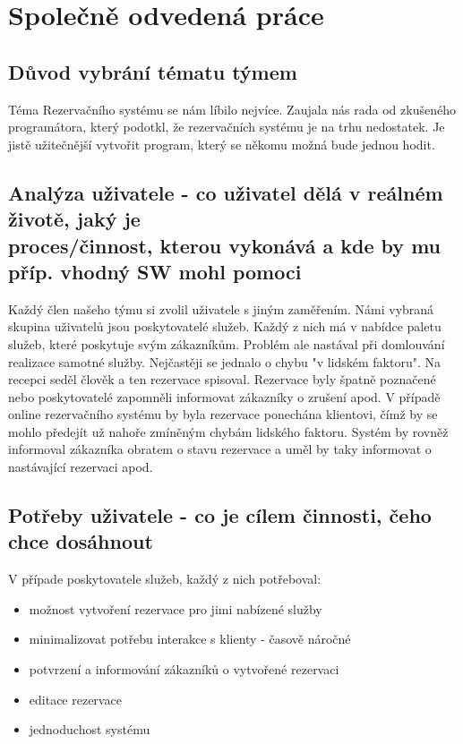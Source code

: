 \section{Společně odvedená práce}

\label{sec:team_work}

\subsection{Důvod vybrání tématu týmem}
Téma Rezervačního systému se nám líbilo nejvíce. Zaujala nás rada od zkušeného programátora, který podotkl, že rezervačních systému je na trhu nedostatek. Je jistě užitečnější vytvořit program, který se někomu možná bude jednou hodit.

\subsection{Analýza uživatele - co uživatel dělá v reálném životě, jaký je\\
proces/činnost, kterou vykonává a kde by mu příp. vhodný SW mohl
pomoci}
Každý člen našeho týmu si zvolil uživatele s jiným zaměřením.
Námi vybraná skupina uživatelů jsou poskytovatelé služeb. Každý z nich má v nabídce paletu služeb, které poskytuje svým zákazníkům.
Problém ale nastával při domlouvání realizace samotné služby. Nejčastěji se jednalo o chybu "v lidském faktoru". Na recepci seděl člověk a ten rezervace spisoval.
Rezervace byly špatně poznačené nebo poskytovatelé zapomněli informovat zákazníky o zrušení apod.
V případě online rezervačního systému by byla rezervace ponechána klientovi, čímž by se mohlo předejít už nahoře zmíněným chybám lidského faktoru.
Systém by rovněž informoval zákazníka obratem o stavu rezervace a uměl by taky informovat o nastávající rezervaci apod.


\subsection{Potřeby uživatele - co je cílem činnosti, čeho chce dosáhnout}
V případe poskytovatele služeb, každý z nich potřeboval:
\begin{itemize}
    \item možnost vytvoření rezervace pro jimi nabízené služby
    \item minimalizovat potřebu interakce s klienty - časově náročné
    \item potvrzení a informování zákazníků o vytvořené rezervaci
    \item editace rezervace
    \item jednoduchost systému
\end{itemize}

